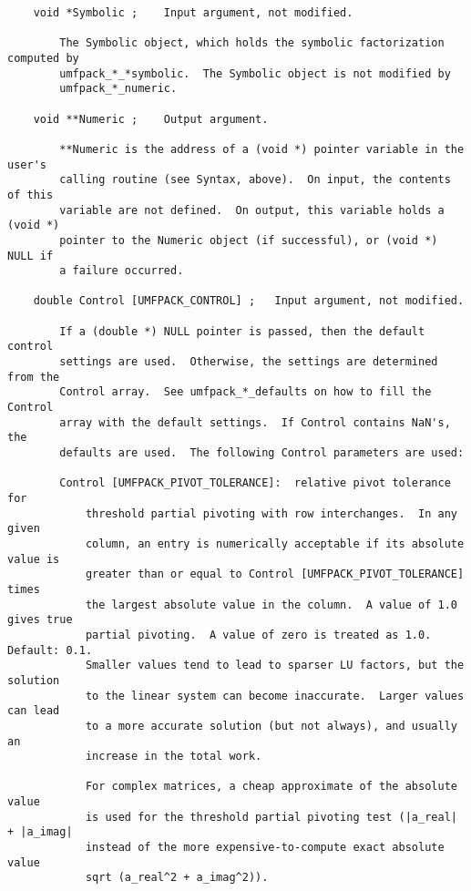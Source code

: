 {\begin{verbatim}
    void *Symbolic ;    Input argument, not modified.

        The Symbolic object, which holds the symbolic factorization computed by
        umfpack_*_*symbolic.  The Symbolic object is not modified by
        umfpack_*_numeric.

    void **Numeric ;    Output argument.

        **Numeric is the address of a (void *) pointer variable in the user's
        calling routine (see Syntax, above).  On input, the contents of this
        variable are not defined.  On output, this variable holds a (void *)
        pointer to the Numeric object (if successful), or (void *) NULL if
        a failure occurred.

    double Control [UMFPACK_CONTROL] ;   Input argument, not modified.

        If a (double *) NULL pointer is passed, then the default control
        settings are used.  Otherwise, the settings are determined from the
        Control array.  See umfpack_*_defaults on how to fill the Control
        array with the default settings.  If Control contains NaN's, the
        defaults are used.  The following Control parameters are used:

        Control [UMFPACK_PIVOT_TOLERANCE]:  relative pivot tolerance for
            threshold partial pivoting with row interchanges.  In any given
            column, an entry is numerically acceptable if its absolute value is
            greater than or equal to Control [UMFPACK_PIVOT_TOLERANCE] times
            the largest absolute value in the column.  A value of 1.0 gives true
            partial pivoting.  A value of zero is treated as 1.0.  Default: 0.1.
            Smaller values tend to lead to sparser LU factors, but the solution
            to the linear system can become inaccurate.  Larger values can lead
            to a more accurate solution (but not always), and usually an
            increase in the total work.

            For complex matrices, a cheap approximate of the absolute value
            is used for the threshold partial pivoting test (|a_real| + |a_imag|
            instead of the more expensive-to-compute exact absolute value
            sqrt (a_real^2 + a_imag^2)).


\end{verbatim}}
